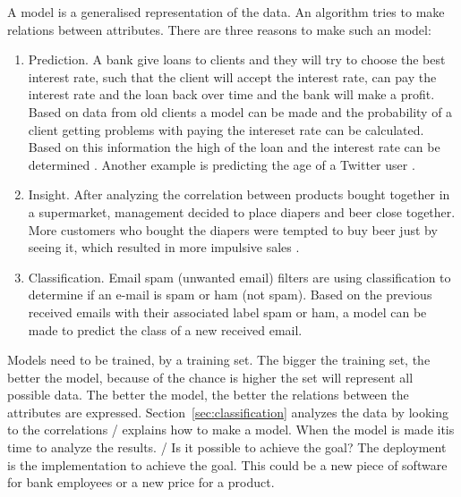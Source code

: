 	A model is a generalised representation of the data. An algorithm tries to make relations between attributes. There are three reasons to make such an model:
	\begin{enumerate}
		\item Prediction. A bank give loans to clients and they will try to choose the best interest rate, such that the client will accept the interest rate, can pay the interest rate and the loan back over time and the bank will make a profit. Based on data from old clients a model can be made and the probability of a client getting problems with paying the intereset rate can be calculated. Based on this information the high of the loan and the interest rate can be determined \cite{credit}. Another example is predicting the age of a Twitter user \cite{tweetgenie}.		
		\item Insight. After analyzing the correlation between products bought together in a supermarket, management decided to place diapers and beer close together. More customers who bought the diapers were tempted to buy beer just by seeing it, which resulted in more impulsive sales \cite{beer}.
		\item Classification. Email spam (unwanted email) filters are using classification to determine if an e-mail is spam or ham (not spam). Based on the previous received emails with their associated label spam or ham, a model can be made to predict the class of a new received email. 
	\end{enumerate}
	Models need to be trained, by a training set. The bigger the training set, the better the model, because of the chance is higher the set will represent all possible data. The better the model, the better the relations between the attributes are expressed. Section~\ref{sec:classification} analyzes the data by looking to the correlations / explains how to make a model. When the model is made itis time to analyze the results. / Is it possible to achieve the goal? The deployment is the implementation to achieve the goal. This could be a new piece of software for bank employees or a new price for a product. 

